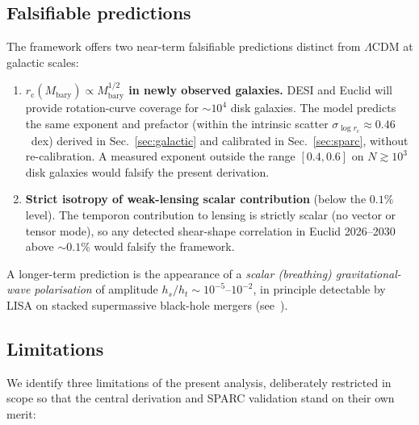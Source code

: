 \documentclass[%
    aps,
    prd,
    reprint,
    superscriptaddress,
    nofootinbib,
    floatfix,
    amsmath,amssymb,
]{revtex4-2}
\newcommand{\Mbary}{M_{\mathrm{bary}}}
\newcommand{\rc}{r_{\mathrm{c}}}
\begin{document}
\subsection{Falsifiable predictions}

The framework offers two near-term falsifiable predictions
distinct from $\Lambda$CDM at galactic scales:

\begin{enumerate}
\item \textbf{$\rc(\Mbary)\propto\Mbary^{1/2}$ in newly observed
galaxies.} DESI and Euclid will provide rotation-curve coverage
for $\sim\!10^{4}$ disk galaxies. The model predicts the same
exponent and prefactor (within the intrinsic scatter
$\sigma_{\log\rc}\!\approx\!0.46$~dex) derived in
Sec.~\ref{sec:galactic} and calibrated in
Sec.~\ref{sec:sparc}, without re-calibration. A measured
exponent outside the range $[0.4,0.6]$ on $N\!\gtrsim\!10^{3}$
disk galaxies would falsify the present derivation.

\item \textbf{Strict isotropy of weak-lensing scalar contribution}
(below the $0.1\%$ level). The temporon contribution to lensing is
strictly scalar (no vector or tensor mode), so any detected
shear-shape correlation in Euclid 2026--2030 above $\sim\!0.1\%$
would falsify the framework.
\end{enumerate}

A longer-term prediction is the appearance of a
\emph{scalar (breathing) gravitational-wave polarisation} of
amplitude $h_{s}/h_{t}\sim 10^{-5}$--$10^{-2}$, in
principle detectable by LISA on stacked supermassive
black-hole mergers (see~\cite{LISA2017}).

\subsection{Limitations}
\label{sec:limitations}

We identify three limitations of the present analysis, deliberately
restricted in scope so that the central derivation and SPARC
validation stand on their own merit:
\end{document}
